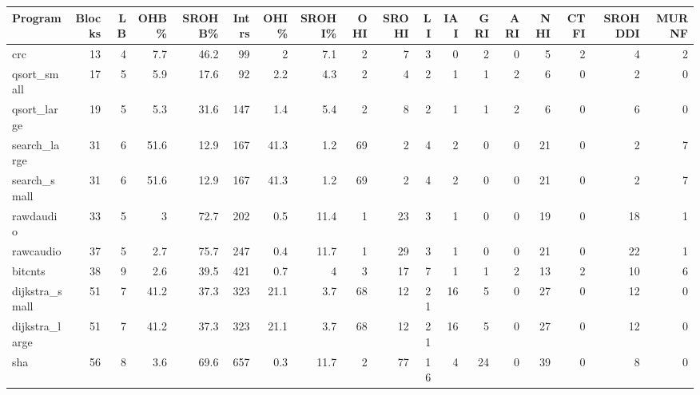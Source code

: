 \begin{tabular}{lrrrrrrrrrrrrrrrrr}
\hline
 Program         &   Blocks &   LB &   OHB\% &   SROHB\% &   Intrs &   OHI\% &   SROHI\% &   OHI &   SROHI &   LI &   IAI &   GRI &   ARI &   NHI &   CTFI &   SROHDDI &   MURNF \\
\hline
 crc             &       13 &    4 &    7.7 &     46.2 &      99 &    2   &      7.1 &     2 &       7 &    3 &     0 &     2 &     0 &     5 &      2 &         4 &       2 \\
 qsort\_small     &       17 &    5 &    5.9 &     17.6 &      92 &    2.2 &      4.3 &     2 &       4 &    2 &     1 &     1 &     2 &     6 &      0 &         2 &       0 \\
 qsort\_large     &       19 &    5 &    5.3 &     31.6 &     147 &    1.4 &      5.4 &     2 &       8 &    2 &     1 &     1 &     2 &     6 &      0 &         6 &       0 \\
 search\_large    &       31 &    6 &   51.6 &     12.9 &     167 &   41.3 &      1.2 &    69 &       2 &    4 &     2 &     0 &     0 &    21 &      0 &         2 &       7 \\
 search\_small    &       31 &    6 &   51.6 &     12.9 &     167 &   41.3 &      1.2 &    69 &       2 &    4 &     2 &     0 &     0 &    21 &      0 &         2 &       7 \\
 rawdaudio       &       33 &    5 &    3   &     72.7 &     202 &    0.5 &     11.4 &     1 &      23 &    3 &     1 &     0 &     0 &    19 &      0 &        18 &       1 \\
 rawcaudio       &       37 &    5 &    2.7 &     75.7 &     247 &    0.4 &     11.7 &     1 &      29 &    3 &     1 &     0 &     0 &    21 &      0 &        22 &       1 \\
 bitcnts         &       38 &    9 &    2.6 &     39.5 &     421 &    0.7 &      4   &     3 &      17 &    7 &     1 &     1 &     2 &    13 &      2 &        10 &       6 \\
 dijkstra\_small  &       51 &    7 &   41.2 &     37.3 &     323 &   21.1 &      3.7 &    68 &      12 &   21 &    16 &     5 &     0 &    27 &      0 &        12 &       0 \\
 dijkstra\_large  &       51 &    7 &   41.2 &     37.3 &     323 &   21.1 &      3.7 &    68 &      12 &   21 &    16 &     5 &     0 &    27 &      0 &        12 &       0 \\
 sha             &       56 &    8 &    3.6 &     69.6 &     657 &    0.3 &     11.7 &     2 &      77 &   16 &     4 &    24 &     0 &    39 &      0 &         8 &       0 \\

\end{tabular}
